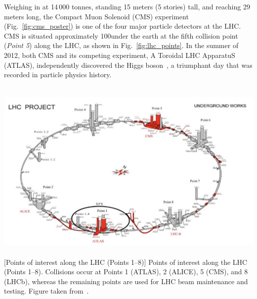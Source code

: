 Weighing in at 14\,000 tonnes, standing 15 meters (5 stories) tall, and reaching 29 meters long, the Compact Muon Solenoid (CMS) experiment (Fig.~\ref{fig:cms_poster}) is one of 
the four major particle detectors at the LHC.
CMS is situated approximately 100\meter under the earth at the fifth collision point (\emph{Point 5}) along the LHC, as shown in Fig.~\ref{fig:lhc_points}.
In the summer of 2012, both CMS and its competing experiment, A Toroidal LHC ApparatuS (ATLAS), independently discovered the Higgs boson~\cite{chatrchyan_observation_2012, ATLAS:2012yve, chatrchyan_observation_2013}, a triumphant day that was recorded in particle physics history.
\begin{multiFigure}
    \centering
        \includegraphics[height=9cm,keepaspectratio]{figures/cms/lhc_points_with_buildings.png}
        [Points of interest along the LHC (Points 1--8)]
        {Points of interest along the LHC (Points 1--8).
        Collisions occur at Points 1 (ATLAS), 2 (ALICE), 5 (CMS), and 8 (LHCb), whereas the remaining points are used for LHC beam maintenance and testing.
        Figure taken from~\cite{lhc_poi}.} 
    \label{fig:lhc_points}
\end{multiFigure}

